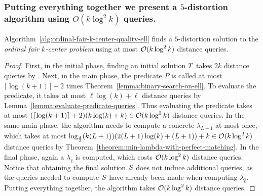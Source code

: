 \subsubsection*{Putting everything together we present a $5$-distortion algorithm using $O(k \log^2 k)$ queries.}
\label{sec:putting-everything-together}

\begin{theorem}
    \label{theorem:putting-everything-together} 
    Algorithm~\ref{alg:ordinal-fair-k-center-quality-ell} finds a $5$-distortion solution to the \emph{ordinal fair $k$-center problem} using at most $\mathcal{O}(k \log^2 k)$ distance queries.
\end{theorem}
\begin{proof}
    First, in the initial phase, finding an initial solution $T$ takes $2k$ distance queries by .
    Next, in the main phase, the predicate $P$ is called at most $\lceil \log(k + 1) \rceil + 2$ times  Theorem~\ref{lemma:binary-search-on-ell}. 
    To evaluate the predicate, it takes at most $\ell \log(k) + \ell$ distance queries by Lemma~\ref{lemma:evaluate-predicate-queries}. 
    Thus evaluating the predicate takes at most $(\lceil \log(k+1) \rceil + 2) (k \log(k) + k) \in \mathcal{O}(k \log^2 k)$ distance queries. 
    In the same main phase, the algorithm needs to compute a concrete $\lambda_{L+1}$ at most once, which takes at most $\log_{\frac{4}{3}}(k (L+1)) (2 (L+1) \log(k) + (L+1)) + k \in \mathcal{O}(k \log^2 k)$ distance queries by Theorem~\ref{theorem:min-lambda-with-perfect-matching}.
    In the final phase, again a $\lambda_{\hat{\ell}}$ is computed,  which costs $\mathcal{O}(k \log^2 k)$ distance queries. 
    Notice that obtaining the final solution $S$ does not induce additional queries, as the queries needed to compute $S$ have already been made when computing $\lambda_{\hat{\ell}}$. 
    Putting everything together, the algorithm takes $\mathcal{O}(k \log^2 k)$ distance queries. 
\end{proof}

